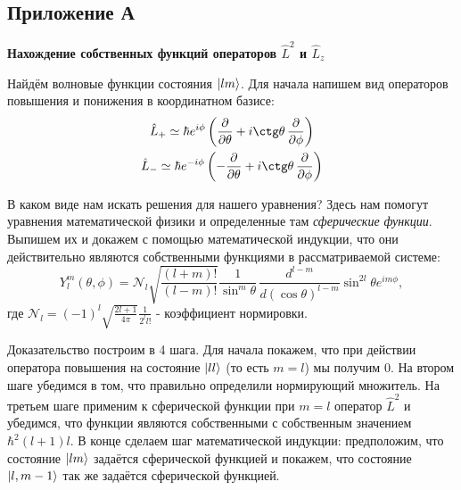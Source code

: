 \setcounter{figure}{0}  
\begin{center}
    \section{Приложение А}\label{appendix:A}
    \textbf{\Large{Нахождение собственных функций операторов $\hat{L}^2$ и $\hat{L}_z$}}
\end{center}

Найдём волновые функции состояния $\ket{lm}$. Для начала напишем вид операторов повышения и понижения в координатном базисе:
\begin{gather*}
\hat{L}_+ \simeq \hbar e^{i\phi}\left(\frac{\partial}{\partial \theta} + i \ctg\theta\,\frac{\partial}{\partial \phi} \right)\\
\hat{L}_- \simeq \hbar e^{-i\phi}\left(-\frac{\partial}{\partial \theta} + i \ctg\theta\,\frac{\partial}{\partial \phi} \right)
\end{gather*}

В каком виде нам искать решения для нашего уравнения? Здесь нам помогут уравнения математической физики и определенные там \textit{сферические функции}. Выпишем их и докажем с помощью математической индукции, что они действительно являются собственными функциями в рассматриваемой системе:
\[
Y^m_l(\theta, \phi) = \mathcal{N}_l\sqrt{\frac{(l+m)!}{(l-m)!}} \frac{1}{\sin^{m}\theta}\,\frac{d^{l-m}}{d(\cos\theta)^{l-m}}\sin^{2l}\theta e^{im\phi},
\]
где $\mathcal{N}_l = (-1)^l \sqrt{\frac{2l+1}{4\pi}}\frac{1}{2^l l!}$ - коэффициент нормировки.

Доказательство построим в 4 шага. Для начала покажем, что при действии оператора повышения на состояние $\ket{ll}$ (то есть $m = l$) мы получим 0. На втором шаге убедимся в том, что правильно определили нормирующий множитель. На третьем шаге применим к сферической функции при $m = l$ оператор $\hat{L}^2$ и убедимся, что функции являются собственными с собственным значением $\hbar^2(l+1)l$. В конце сделаем шаг математической индукции: предположим, что состояние $\ket{lm}$ задаётся сферической функцией и покажем, что состояние $\ket{l, m-1}$ так же задаётся сферической функцией.

